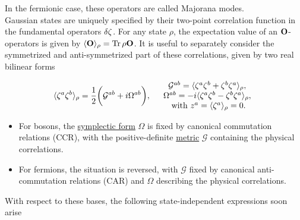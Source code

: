 \documentclass{homework}
\begin{document}
In the fermionic case, these operators are called Majorana modes. \\

Gaussian states are uniquely specified by their two-point correlation function in the fundamental operators $\var{\zeta}$. For any state $\rho$, the expectation value of an ${\bf O}$-operators is given by $\langle {\bf O} \rangle_{\rho} = \Tr \rho {\bf O}$. It is useful to separately consider the symmetrized and anti-symmetrized part of these correlations, given by two real bilinear forms

\begin{equation}
\begin{split} 
    \langle \zeta^a \zeta^b \rangle_{\rho} = \frac{1}{2} \bigg(
        \mathcal{G}^{ab} + i \Omega^{ab}
    \bigg), \quad
\begin{array}{c}
     \mathcal{G}^{ab} = \langle \zeta^a \zeta^b + \zeta^b \zeta^a \rangle_{\rho}, \\
     \Omega^{ab} = -i \langle \zeta^a \zeta^b - \zeta^b \zeta^a \rangle_{\rho}, \\
     \textnormal{ with } z^a = \langle \zeta^a \rangle_{\rho} = 0.  
\end{array}
\end{split}
\end{equation}

\begin{itemize}
    \item For bosons, the \underline{symplectic form} $\Omega$ is fixed by canonical commutation relations (CCR), with the positive-definite \underline{metric} $\mathcal{G}$ containing the physical correlations. 
    \item For fermions, the situation is reversed, with $\mathcal{G}$ fixed by canonical anti-commutation relations (CAR) and $\Omega$ describing the physical correlations. 
\end{itemize}

With respect to these bases, the following state-independent expressions soon arise 
\end{document}
